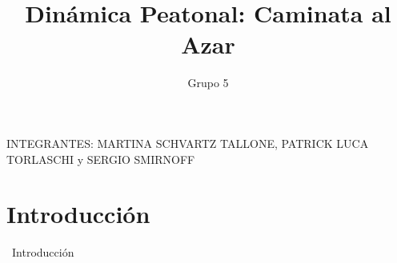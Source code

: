 \documentclass{beamer}
\title{Dinámica Peatonal: Caminata al Azar}
\author{Grupo 5}
\institute{ITBA}
\date{} %
\begin{document}
  \begin{frame}
    \titlepage
    \begin{center}
      \small INTEGRANTES: MARTINA SCHVARTZ TALLONE, PATRICK LUCA TORLASCHI y SERGIO SMIRNOFF
    \end{center}
  \end{frame}

  \section{Introducción}
  \begin{frame}
    \centering
    \colorbox{green!20!gray!30}{%
      \begin{minipage}{0.85\textwidth}
        \centering
        \vspace{0.5cm}
        {\Large\ Introducción}
        \vspace{0.5cm}
      \end{minipage}
    }
  \end{frame}
\end{document}
